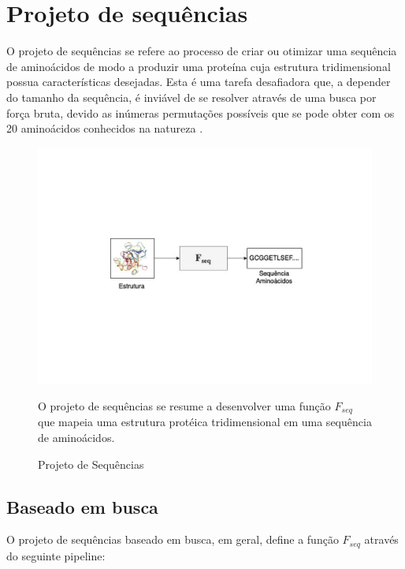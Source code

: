 \section{Projeto de sequências}

O projeto de sequências se refere ao processo de criar ou otimizar uma sequência de aminoácidos de modo a produzir uma proteína cuja estrutura tridimensional possua características desejadas. Esta é uma tarefa desafiadora que, a depender do tamanho da sequência, é inviável de se resolver através de uma busca por força bruta, devido as inúmeras permutações possíveis que se pode obter com os 20 aminoácidos conhecidos na natureza \cite{Overview}.  

\begin{figure}[H]
  \centering
  \includegraphics[width=.8\textwidth]{figuras/metodologia-SeqDes.pdf}
  \caption{Projeto de Sequências}
  O projeto de sequências se resume a desenvolver uma função $F_{seq}$ que mapeia uma estrutura protéica tridimensional em uma sequência de aminoácidos. 
\end{figure}


\subsection{Baseado em busca}
O projeto de sequências baseado em busca, em geral, define a função $F_{seq}$ através do seguinte pipeline:

